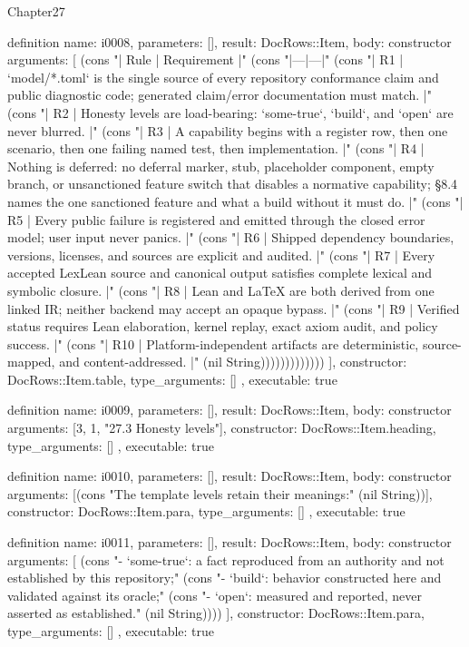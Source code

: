 \begin{lexlean}{Chapter27}
\begin{semanticmodule}
definition{
  name: i0008,
  parameters: [],
  result: DocRows::Item,
  body: constructor{
    arguments: [
      (cons "| Rule | Requirement |" (cons "|---|---|" (cons "| R1 | `model/*.toml` is the single source of every repository conformance claim and public diagnostic code; generated claim/error documentation must match. |" (cons "| R2 | Honesty levels are load-bearing: `some-true`, `build`, and `open` are never blurred. |" (cons "| R3 | A capability begins with a register row, then one scenario, then one failing named test, then implementation. |" (cons "| R4 | Nothing is deferred: no deferral marker, stub, placeholder component, empty branch, or unsanctioned feature switch that disables a normative capability; §8.4 names the one sanctioned feature and what a build without it must do. |" (cons "| R5 | Every public failure is registered and emitted through the closed error model; user input never panics. |" (cons "| R6 | Shipped dependency boundaries, versions, licenses, and sources are explicit and audited. |" (cons "| R7 | Every accepted LexLean source and canonical output satisfies complete lexical and symbolic closure. |" (cons "| R8 | Lean and LaTeX are both derived from one linked IR; neither backend may accept an opaque bypass. |" (cons "| R9 | Verified status requires Lean elaboration, kernel replay, exact axiom audit, and policy success. |" (cons "| R10 | Platform-independent artifacts are deterministic, source-mapped, and content-addressed. |" (nil String)))))))))))))
    ],
    constructor: DocRows::Item.table,
    type_arguments: []
  },
  executable: true
}

definition{
  name: i0009,
  parameters: [],
  result: DocRows::Item,
  body: constructor{
    arguments: [3, 1, "27.3 Honesty levels"],
    constructor: DocRows::Item.heading,
    type_arguments: []
  },
  executable: true
}

definition{
  name: i0010,
  parameters: [],
  result: DocRows::Item,
  body: constructor{
    arguments: [(cons "The template levels retain their meanings:" (nil String))],
    constructor: DocRows::Item.para,
    type_arguments: []
  },
  executable: true
}

definition{
  name: i0011,
  parameters: [],
  result: DocRows::Item,
  body: constructor{
    arguments: [
      (cons "- `some-true`: a fact reproduced from an authority and not established by this repository;" (cons "- `build`: behavior constructed here and validated against its oracle;" (cons "- `open`: measured and reported, never asserted as established." (nil String))))
    ],
    constructor: DocRows::Item.para,
    type_arguments: []
  },
  executable: true
}


\end{semanticmodule}
\end{lexlean}
